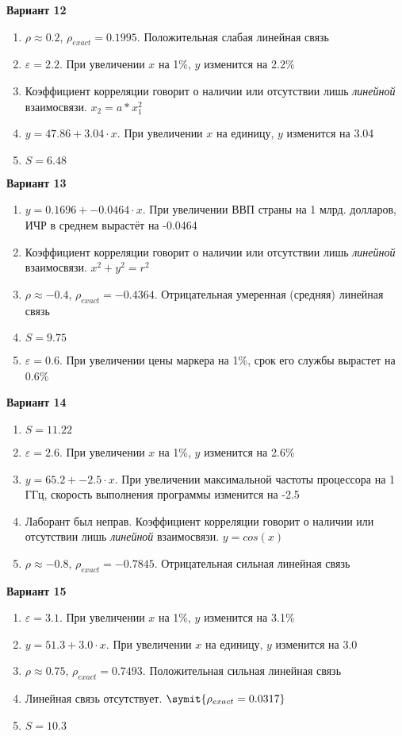 \documentclass{article}
\begin{document}
\textbf{Вариант 12}
\begin{enumerate}
\item $\rho \approx 0.2$, $\rho_{exact} = 0.1995$. Положительная слабая линейная связь
\item $\varepsilon = 2.2$. При увеличении $x$ на 1\%, $y$ изменится на 2.2\%
\item Коэффициент корреляции говорит о наличии или отсутствии лишь \textit{линейной} взаимосвязи. $x_2 = a * x_1 ^ 2$  
\item $y = 47.86+3.04\cdot x$. При увеличении $x$ на единицу, $y$ изменится на 3.04
\item $S = 6.48$
\end{enumerate}

\textbf{Вариант 13}
\begin{enumerate}
\item $y = 0.1696 + -0.0464\cdot x$. При увеличении ВВП страны на 1 млрд. долларов, ИЧР в среднем вырастёт на -0.0464
\item Коэффициент корреляции говорит о наличии или отсутствии лишь \textit{линейной} взаимосвязи. $x ^ 2 + y ^ 2 = r^2$
\item $\rho \approx -0.4$, $\rho_{exact} = -0.4364$. Отрицательная умеренная (средняя) линейная связь
\item $S = 9.75$
\item $\varepsilon = 0.6$. При увеличении цены маркера на 1\%, срок его службы вырастет на 0.6\%
\end{enumerate}

\textbf{Вариант 14}
\begin{enumerate}
\item $S = 11.22$
\item $\varepsilon = 2.6$. При увеличении $x$ на 1\%, $y$ изменится на 2.6\%
\item $y = 65.2+-2.5\cdot x$. При увеличении максимальной частоты процессора на 1 ГГц, скорость выполнения программы изменится на -2.5
\item Лаборант был неправ. Коэффициент корреляции говорит о наличии или отсутствии лишь \textit{линейной} взаимосвязи. $y = cos(x)$
\item $\rho \approx -0.8$, $\rho_{exact} = -0.7845$. Отрицательная сильная линейная связь
\end{enumerate}

\textbf{Вариант 15}
\begin{enumerate}
\item $\varepsilon = 3.1$. При увеличении $x$ на 1\%, $y$ изменится на 3.1\%
\item $y = 51.3+3.0\cdot x$. При увеличении $x$ на единицу, $y$ изменится на 3.0
\item $\rho \approx 0.75$, $\rho_{exact} = 0.7493$. Положительная сильная линейная связь
\item Линейная связь отсутствует. $\symit{\rho_{exact} = 0.0317}$
\item $S = 10.3$
\end{enumerate}
\end{document}
